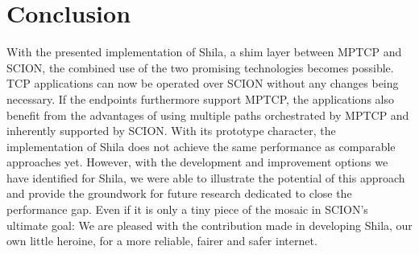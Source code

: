 \chapter{Conclusion}
\label{chap:Conclusion}

With the presented implementation of Shila, a shim layer between MPTCP and SCION, the combined use of the two promising technologies becomes possible. TCP applications can now be operated over SCION without any changes being necessary. If the endpoints furthermore support MPTCP, the applications also benefit from the advantages of using multiple paths orchestrated by MPTCP and inherently supported by SCION. With its prototype character, the implementation of Shila does not achieve the same performance as comparable approaches yet. However, with the development and improvement options we have identified for Shila, we were able to illustrate the potential of this approach and provide the groundwork for future research dedicated to close the performance gap. Even if it is only a tiny piece of the mosaic in SCION's ultimate goal: We are pleased with the contribution made in developing Shila, our own little heroine, for a more reliable, fairer and safer internet.